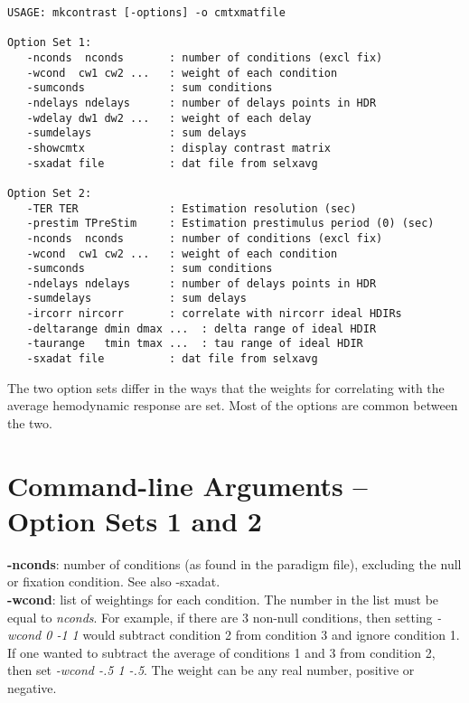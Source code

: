 \documentclass[10pt]{article}
\begin{document}
\begin{small}
\begin{verbatim}
USAGE: mkcontrast [-options] -o cmtxmatfile 

Option Set 1:
   -nconds  nconds       : number of conditions (excl fix)
   -wcond  cw1 cw2 ...   : weight of each condition
   -sumconds             : sum conditions
   -ndelays ndelays      : number of delays points in HDR
   -wdelay dw1 dw2 ...   : weight of each delay
   -sumdelays            : sum delays
   -showcmtx             : display contrast matrix
   -sxadat file          : dat file from selxavg

Option Set 2:
   -TER TER              : Estimation resolution (sec)
   -prestim TPreStim     : Estimation prestimulus period (0) (sec)
   -nconds  nconds       : number of conditions (excl fix)
   -wcond  cw1 cw2 ...   : weight of each condition
   -sumconds             : sum conditions
   -ndelays ndelays      : number of delays points in HDR
   -sumdelays            : sum delays
   -ircorr nircorr       : correlate with nircorr ideal HDIRs
   -deltarange dmin dmax ...  : delta range of ideal HDIR
   -taurange   tmin tmax ...  : tau range of ideal HDIR
   -sxadat file          : dat file from selxavg

\end{verbatim}
\end{small}

The two option sets differ in the ways that the weights for
correlating with the average hemodynamic response are set.
Most of the options are common between the two.\\

\section{Command-line Arguments -- Option Sets 1 and 2}

\noindent
{\bf -nconds}: number of conditions (as found in the paradigm file),
excluding the null or fixation condition. See also -sxadat.\\

\noindent
{\bf -wcond}: list of weightings for each condition.  The number in
the list must be equal to {\em nconds}. For example, if there are 3
non-null conditions, then setting {\em -wcond 0 -1 1} would subtract
condition 2 from condition 3 and ignore condition 1.  If one wanted to
subtract the average of conditions 1 and 3 from condition 2, then set 
{\em -wcond -.5 1 -.5}.  The weight can be any real number, positive
or negative.\\
\end{document}
